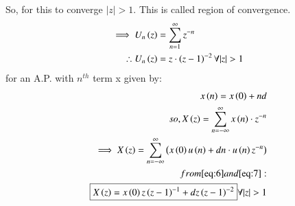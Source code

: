 \documentclass[journal,12pt,twocolumn]{IEEEtran}
\theoremstyle{remark}
\begin{document}
So, for this to converge $ |z|>1$. This is called region of convergence.\\
\begin{align}
\implies U_n\brak{z} &= \sum_{n=1}^{\infty} z^{-n}\\
\therefore U_n\brak{z} &= z\cdot\brak{z-1}^{-2} \forall |z|>1 \label{eq:7}
\end{align}
for an A.P. with $ n^{th}$ term x given by:\\
\begin{align}
x\brak{n} = x\brak{0} + nd\\
so, X\brak{z} = \sum_{n=-\infty}^{\infty} x\brak{n}\cdot z^{-n}\\
\implies X\brak{z} = \sum_{n=-\infty}^{\infty} \brak{x\brak{0}u\brak{n} + dn\cdot u\brak{n}z^{-n}}\\
\notag from \eqref{eq:6} and \eqref{eq:7}: \\
\boxed{X\brak{z} = x\brak{0}z\brak{z-1}^{-1} + dz\brak{z-1}^{-2}}  \forall  |z|>1 \label{eq:5}
\end{align}
\end{document}

